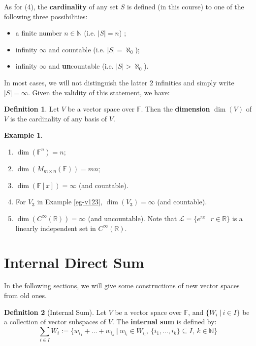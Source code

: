 \documentclass[11pt,openany]{book}
\theoremstyle{plain}
\theoremstyle{definition}
\newtheorem{definition}[definition]{Definition}
\newtheorem{example}[example]{Example}
\theoremstyle{remark}
\begin{document}
As for (4), the {\bf cardinality} of any set $S$ is defined (in this course) to one of the following three possibilities:
\begin{itemize}
    \item a finite number $n \in \mathbb{N}$ (i.e. $|S|= n$) ;
    \item infinity $\infty$ and countable (i.e. $|S| = \aleph_0$);
    \item infinity $\infty$ and {\bf un}countable (i.e. $|S| > \aleph_0$).
\end{itemize}
In most cases, we will not distinguish the latter $2$ infinities and simply write $|S| = \infty$. Given the validity of this statement, we have:
\begin{definition}
    Let $V$ be a vector space over $\mathbb{F}$. Then the {\bf dimension} $\dim(V)$ of $V$ is the cardinality of any basis of $V$.
\end{definition}
\begin{example}
\begin{enumerate}
    \item $\dim(\mathbb{F}^n) = n$; 
    \item $\dim(M_{m \times n}(\mathbb{F})) = mn$;
    \item $\dim(\mathbb{F}[x]) = \infty$ (and countable).
    \item For $V_3$ in Example \ref{eg-v123}, $\dim(V_3) = \infty$ (and countable).
    \item $\dim(C^{\infty}(\mathbb{R})) = \infty$ (and uncountable). Note that $\mathcal{L} = \{e^{rx}\ |\ r \in \mathbb{R}\}$ is a linearly independent set in $C^{\infty}(\mathbb{R})$.
\end{enumerate}
\end{example}

\section{Internal Direct Sum}
In the following sections, we will give some constructions of new vector spaces from old ones.

\begin{definition}[Internal Sum]
    Let $V$ be a vector space over $\mathbb{F}$, and $\{W_i\ |\ i \in I\}$ be a collection of vector subspaces of $V$. The {\bf internal sum} is defined by:
    $$\sum_{i \in I} W_i := \{w_{i_1} + \dots + w_{i_k}\ |\ w_{i_l} \in W_{i_l},\ \{i_1, \dots, i_k\}\subseteq I,\ k \in \mathbb{N}\}$$
\end{definition}
\end{document}
